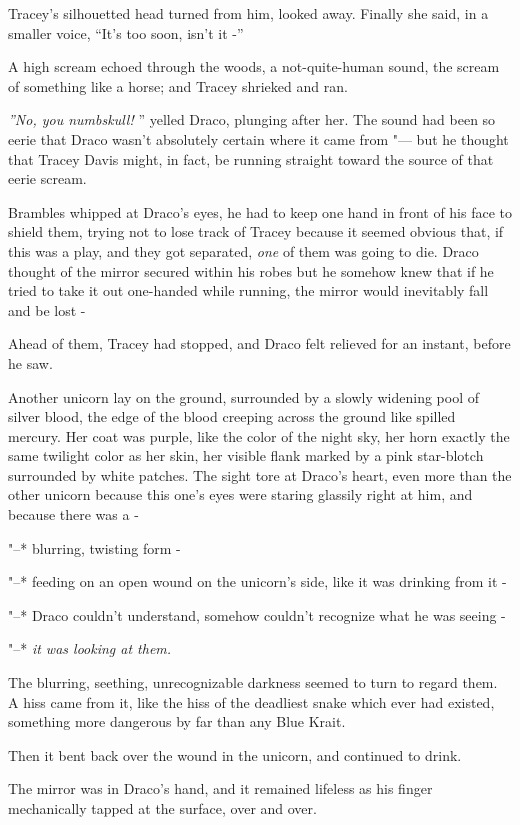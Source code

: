 Tracey's silhouetted head turned from him, looked away. Finally she
said, in a smaller voice, ``It's too soon, isn't it -''

A high scream echoed through the woods, a not-quite-human sound, the
scream of something like a horse; and Tracey shrieked and ran.

\emph{''No, you numbskull!} '' yelled Draco, plunging after her. The sound
had been so eerie that Draco wasn't absolutely certain where it came
from "--- but he thought that Tracey Davis might, in fact, be running
straight toward the source of that eerie scream.

Brambles whipped at Draco's eyes, he had to keep one hand in front of
his face to shield them, trying not to lose track of Tracey because it
seemed obvious that, if this was a play, and they got separated,
\emph{one} of them was going to die. Draco thought of the mirror secured
within his robes but he somehow knew that if he tried to take it out
one-handed while running, the mirror would inevitably fall and be lost -

Ahead of them, Tracey had stopped, and Draco felt relieved for an
instant, before he saw.

Another unicorn lay on the ground, surrounded by a slowly widening pool
of silver blood, the edge of the blood creeping across the ground like
spilled mercury. Her coat was purple, like the color of the night sky,
her horn exactly the same twilight color as her skin, her visible flank
marked by a pink star-blotch surrounded by white patches. The sight tore
at Draco's heart, even more than the other unicorn because this one's
eyes were staring glassily right at him, and because there was a -

"--* blurring, twisting form -

"--* feeding on an open wound on the unicorn's side, like it was drinking
from it -

"--* Draco couldn't understand, somehow couldn't recognize what he was
seeing -

"--* \emph{it was looking at them.}

The blurring, seething, unrecognizable darkness seemed to turn to regard
them. A hiss came from it, like the hiss of the deadliest snake which
ever had existed, something more dangerous by far than any Blue Krait.

Then it bent back over the wound in the unicorn, and continued to drink.

The mirror was in Draco's hand, and it remained lifeless as his finger
mechanically tapped at the surface, over and over.

